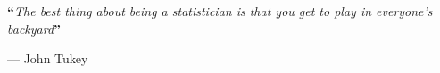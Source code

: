 \thispagestyle{empty}

\cleardoublepage

\thispagestyle{empty}

\vspace*{5cm}
\begin{center}
\begin{minipage}[c]{0.75\textwidth}
\begin{center}
{\Huge {\rmfamily \textbf{``}}{\itshape The best thing about being a statistician is that you get to play in everyone's backyard}{\rmfamily \textbf{''}}\vspace{0.5em}}{\LARGE \begin{flushright}--- John Tukey\end{flushright}}
\end{center}
\end{minipage}
\end{center}
\vspace*{\fill}

\frontmatter


\cleardoublepage
